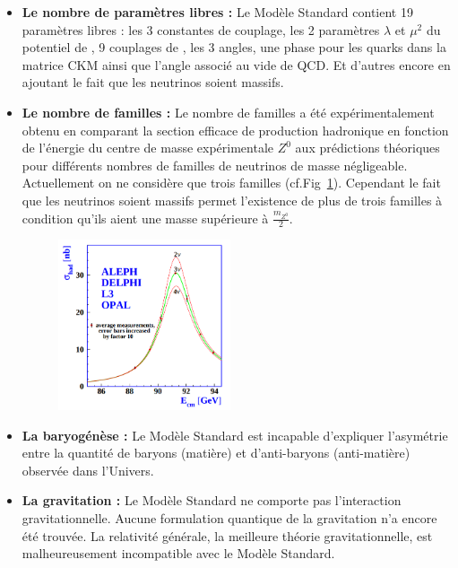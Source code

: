 \begin{itemize}[label=$\bullet$]
\item \textbf{Le nombre de paramètres libres :} Le Modèle Standard contient \num{19} paramètres libres : les \num{3} constantes de couplage, les \num{2} paramètres $\lambda$ et $\mu^2$ du potentiel de , \num{9} couplages de , les \num{3} angles, une phase pour les quarks dans la matrice CKM ainsi que l'angle associé au vide de QCD. Et d'autres encore en ajoutant le fait que les neutrinos soient massifs.

\item \textbf{Le nombre de familles :} Le nombre de familles a été expérimentalement obtenu en comparant la section efficace de production hadronique en fonction de l'énergie du centre de masse expérimentale $Z^{0}$ aux prédictions théoriques pour différents nombres de familles de neutrinos de masse négligeable. Actuellement on ne considère que trois familles (cf.Fig~\ref{neutrinos}). Cependant le fait que les neutrinos soient massifs permet l'existence de plus de trois familles à condition qu'ils aient une masse supérieure à $\frac{m_{Z^{0}}}{2}$.
\begin{figure}[ht!]
\centering
\includegraphics[width=0.48\textwidth]{SM/neutrinos.png}
\label{neutrinos}
\end{figure}

\item \textbf{La baryogénèse :} Le Modèle Standard est incapable d'expliquer l'asymétrie entre la quantité de baryons (matière) et d'anti-baryons (anti-matière) observée dans l'Univers.

\item \textbf{La gravitation :} Le Modèle Standard ne comporte pas l'interaction gravitationnelle. Aucune formulation quantique de la gravitation n'a encore été trouvée. La relativité générale, la meilleure théorie gravitationnelle, est malheureusement incompatible avec le Modèle Standard.


\end{itemize}
